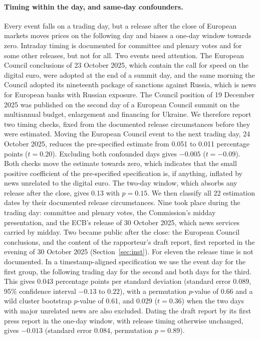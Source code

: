 \documentclass[11pt]{article}
\theoremstyle{plain}\newtheorem{proposition}{Proposition}
\begin{document}
\paragraph{Timing within the day, and same-day confounders.} Every event falls on a trading day, but a release after the close of European markets moves prices on the following day and biases a one-day window towards zero. Intraday timing is documented for committee and plenary votes and for some other releases, but not for all. Two events need attention. The European Council conclusions of 23 October 2025, which contain the call for speed on the digital euro, were adopted at the end of a summit day, and the same morning the Council adopted its nineteenth package of sanctions against Russia, which is news for European banks with Russian exposure. The Council position of 19 December 2025 was published on the second day of a European Council summit on the multiannual budget, enlargement and financing for Ukraine. We therefore report two timing checks, fixed from the documented release circumstances before they were estimated. Moving the European Council event to the next trading day, 24 October 2025, reduces the pre-specified estimate from 0.051 to 0.011 percentage points ($t = 0.20$). Excluding both confounded days gives $-0.005$ ($t = -0.09$). Both checks move the estimate towards zero, which indicates that the small positive coefficient of the pre-specified specification is, if anything, inflated by news unrelated to the digital euro. The two-day window, which absorbs any release after the close, gives 0.13 with $p = 0.15$. We then classify all 22 estimation dates by their documented release circumstances. Nine took place during the trading day: committee and plenary votes, the Commission's midday presentation, and the ECB's release of 30 October 2025, which news services carried by midday. Two became public after the close: the European Council conclusions, and the content of the rapporteur's draft report, first reported in the evening of 30 October 2025 (Section~\ref{sec:inst}). For eleven the release time is not documented. In a timestamp-aligned specification we use the event day for the first group, the following trading day for the second and both days for the third. This gives 0.043 percentage points per standard deviation (standard error 0.089, 95\% confidence interval $-0.13$ to $0.22$), with a permutation $p$-value of 0.66 and a wild cluster bootstrap $p$-value of 0.61, and 0.029 ($t = 0.36$) when the two days with major unrelated news are also excluded. Dating the draft report by its first press report in the one-day window, with release timing otherwise unchanged, gives $-0.013$ (standard error 0.084, permutation $p = 0.89$).
\end{document}
